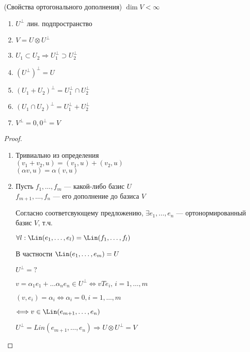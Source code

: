 \begin{theorem}(Свойства ортогонального дополнения)
    $\dim{V} < \infty$
    \begin{enumerate}
        \item $U^{\perp}$ лин. подпространство
        \item $V = U \otimes U^{\perp}$
        \item $U_1 \subset U_2 \Longrightarrow U_1^{\perp} \supset U_2^{\perp}$
        \item $(U^{\perp})^{\perp} = U$
        \item $(U_1 + U_2)^{\perp} = U_1^{\perp} \cap U_2^{\perp}$
        \item $(U_1 \cap U_2)^{\perp} = U_1^{\perp} + U_2^{\perp}$
        \item $V^{\perp} = 0, 0^{\perp} = V$
    \end{enumerate}
    \emptyln
    \begin{proof}
        \begin{enumerate}
            \item Тривиально из определения \\
            $(v_1 + v_2, u) = (v_1, u) + (v_2, u)$ \\
            $(\alpha v, u) = \alpha(v, u)$
            \item Пусть $f_1, \dots, f_m$ --- какой-либо базис $U$ \\
            $f_{m + 1}, \dots, f_n$ --- его дополнение до базиса $V$

            Согласно соответсвующему предложению, $\exists e_1, \dots, e_n$ --- ортонормированный базис $V$, т.ч.

            $\forall l: \Lin(e_1, \dots, e_l) = \Lin(f_1, \dots, f_l)$

            В частности $\Lin(e_1, \dots, e_m) = U$

            $U^{\perp} = ?$

            $v = \alpha_1 e_1 + \dots \alpha_n e_n \in U^{\perp} \Longleftrightarrow v T e_i, \, i = 1, \dots, m$

            $(v, e_i) = \alpha_i \Longleftrightarrow \alpha_i = 0, i = 1, \dots, m$

            $\Longleftrightarrow v \in \Lin(e_{m + 1}, \dots, e_n)$

            $U^{\perp} = Lin(e_{m + 1}, \dots, e_n) \Longrightarrow U \otimes U^{\perp} = V$
            

\end{enumerate}
\end{proof}
\end{theorem}
